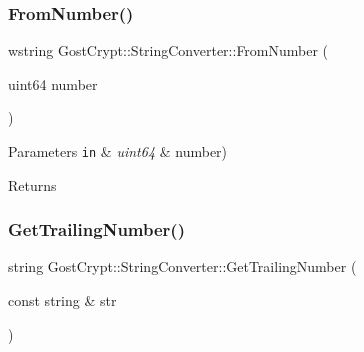 \subsubsection{\texorpdfstring{From\+Number()}{FromNumber()}\hspace{0.1cm}{\footnotesize\ttfamily [5/5]}}
{\footnotesize\ttfamily wstring Gost\+Crypt\+::\+String\+Converter\+::\+From\+Number (\begin{DoxyParamCaption}\item[{uint64}]{number }\end{DoxyParamCaption})\hspace{0.3cm}{\ttfamily [static]}}


\begin{DoxyParams}[1]{Parameters}
\mbox{\tt in}  & {\em uint64} & number) \\
\hline
\end{DoxyParams}
\begin{DoxyReturn}{Returns}

\end{DoxyReturn}
\mbox{\label{class_gost_crypt_1_1_string_converter_a90ae47fd725ce6960c4a93ae79a89806}} 
\subsubsection{\texorpdfstring{Get\+Trailing\+Number()}{GetTrailingNumber()}}
{\footnotesize\ttfamily string Gost\+Crypt\+::\+String\+Converter\+::\+Get\+Trailing\+Number (\begin{DoxyParamCaption}\item[{const string \&}]{str }\end{DoxyParamCaption})\hspace{0.3cm}{\ttfamily [static]}}


